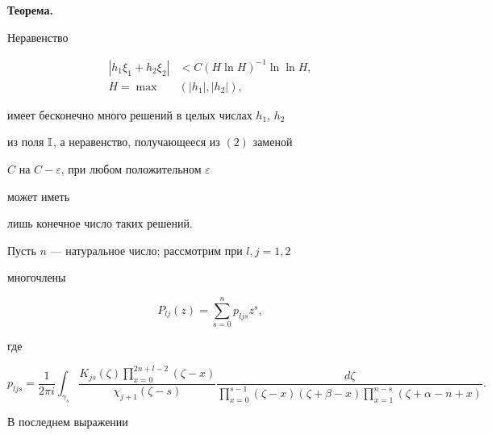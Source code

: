  


{\bf Теорема.} {\it 


Неравенство 


\begin{equation} 


\begin{split} 


|h_1\xi_1+h_2\xi_2|&<C(H\ln H)^{-1}\ln\ln H, \\ 


H=\max&(|h_1|,|h_2|), 


\end{split} 


\end{equation} 


имеет бесконечно много решений в целых числах $h_1$, $h_2$ 


из поля $\Bbb I$, а неравенство, получающееся из $(2)$ заменой 


$C$ на $C-\varepsilon$, при любом положительном $\varepsilon$ 


может иметь 


лишь конечное число таких решений. 


} 


\medskip 


 


Пусть $n$ --- натуральное число; рассмотрим при $l,j=1,2$ 


многочлены 


\begin{equation} 


P_{lj}(z)=\sum^n_{s=0}p_{ljs}z^s, 


\end{equation} 


где 


\begin{equation} 


p_{ljs}=\frac{1}{2\pi i}\int_{\gamma_s} 


\frac{K_{js}(\zeta)\prod\limits^{2n+l-2}_{x=0}(\zeta-x)} 


{\chi_{j+1}(\zeta-s)} 


\frac{d\zeta}{\prod\limits^{s-1}_{x=0} 


(\zeta-x)(\zeta+\beta-x)\prod\limits^{n-s}_{x=1} 


(\zeta+\alpha-n+x)}. 


\end{equation} 


В последнем выражении 


